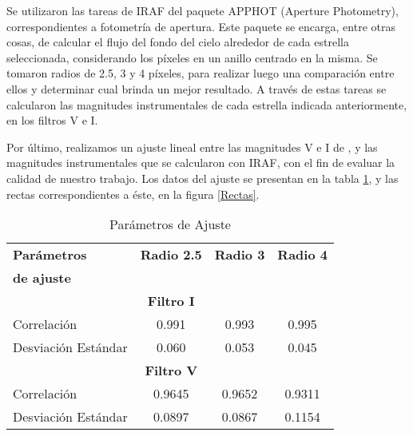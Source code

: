 \documentclass[baaa]{baaa}
\begin{document}
Se utilizaron las tareas de IRAF del paquete APPHOT (Aperture Photometry), correspondientes a fotometría de apertura. Este paquete se encarga, entre otras cosas, de calcular el flujo del fondo del cielo alrededor de cada estrella seleccionada, considerando los píxeles en un anillo centrado en la misma. Se tomaron radios de 2.5, 3 y 4 píxeles, para realizar luego una comparación entre ellos y determinar cual brinda un mejor resultado. A través de estas tareas se calcularon las magnitudes instrumentales de cada estrella indicada anteriormente, en los filtros V e I.

Por último, realizamos un ajuste lineal entre las magnitudes V e I de \citep{2016A&A...590A...9D}, y las magnitudes instrumentales que se calcularon con IRAF, con el fin de evaluar la calidad de nuestro trabajo. Los datos del ajuste se presentan en la tabla \ref{Datos del ajuste}, y las rectas correspondientes a éste, en la figura \ref{Rectas}. 


\begin{table}[!t]
\centering
\caption{Parámetros de Ajuste}
\begin{tabular}{lccc}
\hline\hline\noalign{\smallskip}
\!\!\textbf{Parámetros} & \!\!\!\!\textbf{Radio 2.5} & \!\!\!\!\textbf{Radio 3} & \!\!\!\!\textbf{Radio 4} \!\!\!\!\\
\textbf{de ajuste} & \!\!\!\!  & \!\!\!\! & \!\!\!\!  \\
\hline\noalign{\smallskip}
\!\! & \textbf{Filtro I} &  &   \\
\hline\noalign{\smallskip}
\!\!Correlación & 0.991 & 0.993 & 0.995 \\
\!\!Desviación Estándar & 0.060 & 0.053 & 0.045\\
\hline\noalign{\smallskip}
\!\! & \textbf{Filtro V} &  &   \\
\hline\noalign{\smallskip}
\!\!Correlación & 0.9645 & 0.9652 & 0.9311  \\
\!\!Desviación Estándar & 0.0897 & 0.0867 & 0.1154 \\
\hline
\end{tabular}
\label{Datos del ajuste}
\end{table}



\begin{figure*}
		\centering
        
		\caption{Ajuste lineal de las magnitudes instrumentales en función de las magnitudes encontradas en la literatura, para los tres diafragmas utilizados. \emph{Panel izquierdo:} filtro I. \emph{Panel derecho:} filtro V}
		\label{Rectas}
		
\end{figure*}
\end{document}
